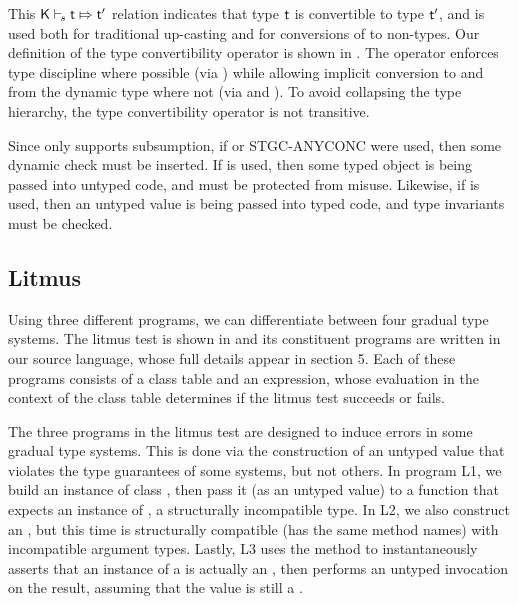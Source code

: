 \documentclass[USenglish]{tex/lipics-v2016}
\begin{document}
This $\ConvertE\K{s}{\t}{\tp}$ relation indicates that type $\t$ is
convertible to type $\tp$, and is used both for traditional up-casting and
for conversions of \any to non-\any types. Our definition of the type
convertibility operator is shown in . The operator
enforces type discipline where possible (via ) while
allowing implicit conversion to and from the dynamic type where not (via
 and ). To avoid collapsing the
type hierarchy, the type convertibility operator is not transitive.


Since \kafka only supports subsumption, if  or \RuleRef
{STGC-ANYCONC} were used, then some dynamic check must be inserted. If
 is used, then some typed object is being passed into
untyped code, and must be protected from misuse. Likewise, if
 is used, then an untyped value is being passed into
typed code, and type invariants must be checked.

\subsection{Litmus}

Using three different programs, we can differentiate between four gradual type
systems. The litmus test is shown in  and its constituent
programs are written in our source language, whose full details appear in 
section 5. Each of these programs consists of a class table and an expression,
whose evaluation in the context of the class table determines if the litmus test
succeeds or fails.

The three programs in the litmus test are designed to induce errors in some
gradual type systems. This is done via the construction of an untyped value
that violates the type guarantees of some systems, but not others. In program
L1, we build an instance of class , then pass it (as an untyped value)
to a function that expects an instance of , a structurally incompatible
type. In L2, we also construct an , but this time  is structurally
compatible (has the same method names) with incompatible argument types.
Lastly, L3 uses the method \m to instantaneously asserts that an instance of a
\C is actually an , then performs an untyped invocation on the result,
assuming that the value is still a \C.
\end{document}
